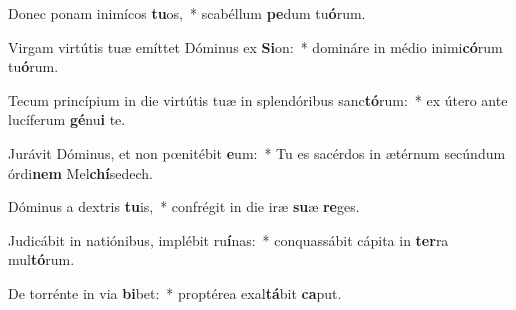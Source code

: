 \item Donec ponam inimícos \textbf{tu}os,~* scabéllum \textbf{pe}dum tu\textbf{ó}rum.
\item Virgam virtútis tuæ emíttet Dóminus ex \textbf{Si}on:~* domináre in médio inimi\textbf{có}rum tu\textbf{ó}rum.
\item Tecum princípium in die virtútis tuæ in splendóribus sanc\textbf{tó}rum:~* ex útero ante lucíferum \textbf{gé}nu\textbf{i} te.
\item Jurávit Dóminus, et non pœnitébit \textbf{e}um:~* Tu es sacérdos in ætérnum secúndum órdi\textbf{nem} Mel\textbf{chí}sedech.
\item Dóminus a dextris \textbf{tu}is,~* confrégit in die iræ \textbf{su}æ \textbf{re}ges.
\item Judicábit in natiónibus, implébit ru\textbf{í}nas:~* conquassábit cápita in \textbf{ter}ra mul\textbf{tó}rum.
\item De torrénte in via \textbf{bi}bet:~* proptérea exal\textbf{tá}bit \textbf{ca}put.
